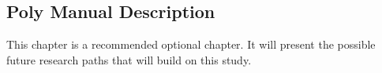 \documentclass{article}
\begin{document}
\begin{body}
\section{Poly Manual Description}
This chapter is a recommended optional chapter. It will present the possible future research paths that will build on this study.





\renewcommand{\bibsection}{\topskip=1in\chapter*{REFERENCES}\topskip=0in \addcontentsline{toc}{chapter}{REFERENCES}}

\singlespacing






\doublespacing
{}
\end{body}
\end{document}

